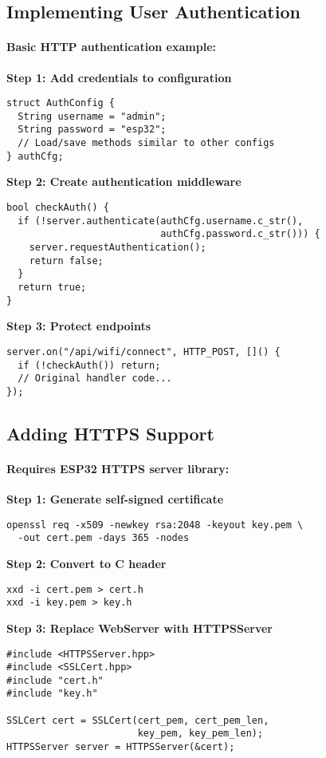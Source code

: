 \documentclass[11pt,a4paper]{article}
\begin{document}
\subsection{Implementing User Authentication}

\paragraph{Basic HTTP authentication example:}

\textbf{Step 1: Add credentials to configuration}
\begin{verbatim}
struct AuthConfig {
  String username = "admin";
  String password = "esp32";
  // Load/save methods similar to other configs
} authCfg;
\end{verbatim}

\textbf{Step 2: Create authentication middleware}
\begin{verbatim}
bool checkAuth() {
  if (!server.authenticate(authCfg.username.c_str(), 
                           authCfg.password.c_str())) {
    server.requestAuthentication();
    return false;
  }
  return true;
}
\end{verbatim}

\textbf{Step 3: Protect endpoints}
\begin{verbatim}
server.on("/api/wifi/connect", HTTP_POST, []() {
  if (!checkAuth()) return;
  // Original handler code...
});
\end{verbatim}

\subsection{Adding HTTPS Support}

\paragraph{Requires ESP32 HTTPS server library:}

\textbf{Step 1: Generate self-signed certificate}
\begin{verbatim}
openssl req -x509 -newkey rsa:2048 -keyout key.pem \
  -out cert.pem -days 365 -nodes
\end{verbatim}

\textbf{Step 2: Convert to C header}
\begin{verbatim}
xxd -i cert.pem > cert.h
xxd -i key.pem > key.h
\end{verbatim}

\textbf{Step 3: Replace WebServer with HTTPSServer}
\begin{verbatim}
#include <HTTPSServer.hpp>
#include <SSLCert.hpp>
#include "cert.h"
#include "key.h"

SSLCert cert = SSLCert(cert_pem, cert_pem_len, 
                       key_pem, key_pem_len);
HTTPSServer server = HTTPSServer(&cert);
\end{verbatim}
\end{document}
